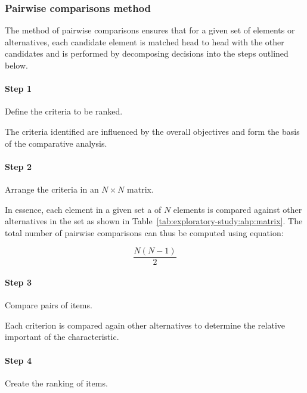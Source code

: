 \subsubsection{Pairwise comparisons method}
\label{sec:exploratory-study:research-methods:ahp:pairwise}

The method of pairwise comparisons ensures that for a given set of elements or
alternatives, each candidate element is matched head to head with the other
candidates and is performed by decomposing decisions \citep{Saaty2008} into the
steps outlined below.

\paragraph{Step 1} Define the criteria to be ranked. 

The criteria identified are influenced by the overall objectives and form the
basis of the comparative analysis.

\paragraph{Step 2} Arrange the criteria in an $N\times N$ matrix.

In essence, each element in a given set a of $N$ elements is compared against
other alternatives in the set as shown in Table~\ref{tab:exploratory-study:ahp:matrix}. The total number of pairwise
comparisons can thus be computed using equation:

\begin{equation*}
 \frac{N (N-1)}{2}
\end{equation*}

\tablespacing

\bodyspacing

\paragraph{Step 3} Compare pairs of items. 

Each criterion is compared again
other alternatives to determine the relative important of the characteristic.

\paragraph{Step 4} Create the ranking of items. 

